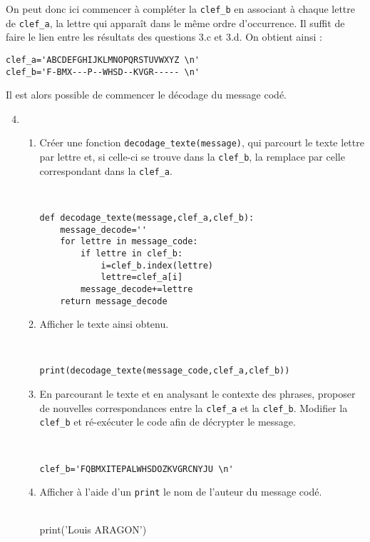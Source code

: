On peut donc ici commencer à compléter la \verb?clef_b? en associant à chaque lettre de \verb?clef_a?, la lettre qui apparaît dans le même ordre d'occurrence. Il suffit de faire le lien entre les résultats des questions 3.c et 3.d. On obtient ainsi :
\begin{verbatim}
clef_a='ABCDEFGHIJKLMNOPQRSTUVWXYZ \n'
clef_b='F-BMX---P--WHSD--KVGR----- \n'
\end{verbatim}

Il est alors possible de commencer le décodage du message codé.

\begin{enumerate}
\setcounter{enumi}{3}
\item \begin{enumerate}
\item Créer une fonction \verb?decodage_texte(message)?, qui parcourt le texte lettre par lettre et, si celle-ci se trouve dans la \verb?clef_b?, la remplace par celle correspondant dans la \verb?clef_a?.
\begin{solution}~\ \\
\begin{verbatim}
def decodage_texte(message,clef_a,clef_b):
    message_decode=''
    for lettre in message_code:
        if lettre in clef_b:
            i=clef_b.index(lettre)
            lettre=clef_a[i]
        message_decode+=lettre
    return message_decode
\end{verbatim}
\end{solution}

\item Afficher le texte ainsi obtenu.
\begin{solution}~\ \\
\begin{verbatim}
print(decodage_texte(message_code,clef_a,clef_b))
\end{verbatim}
\end{solution}
\item En parcourant le texte et en analysant le contexte des phrases, proposer de nouvelles correspondances entre la \verb?clef_a? et la \verb?clef_b?. Modifier la \verb?clef_b? et ré-exécuter le code afin de décrypter le message.
\begin{solution}~\ \\
\begin{verbatim}
clef_b='FQBMXITEPALWHSDOZKVGRCNYJU \n'
\end{verbatim}
\end{solution}
\item Afficher à l'aide d'un \verb?print? le nom de l'auteur du message codé.
\begin{solution}~\ \\
print('Louis ARAGON')
\end{solution}
\end{enumerate}
\end{enumerate}


